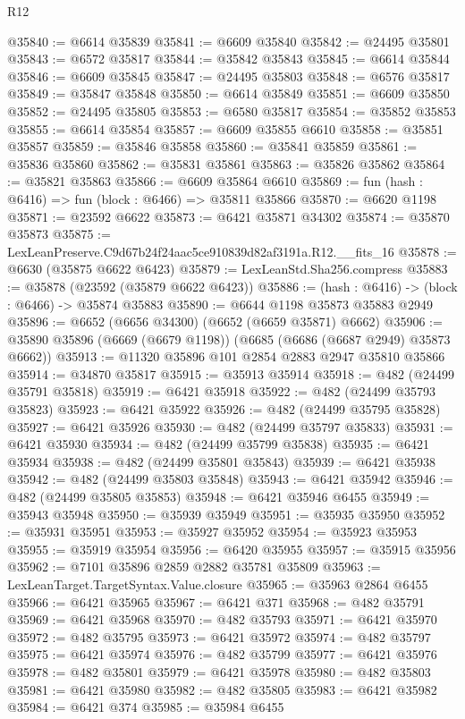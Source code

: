 \begin{lexlean}{R12}
\begin{coremodule}
@35840 := @6614 @35839
@35841 := @6609 @35840
@35842 := @24495 @35801
@35843 := @6572 @35817
@35844 := @35842 @35843
@35845 := @6614 @35844
@35846 := @6609 @35845
@35847 := @24495 @35803
@35848 := @6576 @35817
@35849 := @35847 @35848
@35850 := @6614 @35849
@35851 := @6609 @35850
@35852 := @24495 @35805
@35853 := @6580 @35817
@35854 := @35852 @35853
@35855 := @6614 @35854
@35857 := @6609 @35855 @6610
@35858 := @35851 @35857
@35859 := @35846 @35858
@35860 := @35841 @35859
@35861 := @35836 @35860
@35862 := @35831 @35861
@35863 := @35826 @35862
@35864 := @35821 @35863
@35866 := @6609 @35864 @6610
@35869 := fun (hash : @6416) => fun (block : @6466) => @35811 @35866
@35870 := @6620 @1198
@35871 := @23592 @6622
@35873 := @6421 @35871 @34302
@35874 := @35870 @35873
@35875 := LexLeanPreserve.C9d67b24f24aac5ce910839d82af3191a.R12.__fits_16
@35878 := @6630 (@35875 @6622 @6423)
@35879 := LexLeanStd.Sha256.compress
@35883 := @35878 (@23592 (@35879 @6622 @6423))
@35886 := (hash : @6416) -> (block : @6466) -> @35874 @35883
@35890 := @6644 @1198 @35873 @35883 @2949
@35896 := @6652 (@6656 @34300) (@6652 (@6659 @35871) @6662)
@35906 := @35890 @35896 (@6669 (@6679 @1198)) (@6685 (@6686 (@6687 @2949) @35873 @6662))
@35913 := @11320 @35896 @101 @2854 @2883 @2947 @35810 @35866
@35914 := @34870 @35817
@35915 := @35913 @35914
@35918 := @482 (@24499 @35791 @35818)
@35919 := @6421 @35918
@35922 := @482 (@24499 @35793 @35823)
@35923 := @6421 @35922
@35926 := @482 (@24499 @35795 @35828)
@35927 := @6421 @35926
@35930 := @482 (@24499 @35797 @35833)
@35931 := @6421 @35930
@35934 := @482 (@24499 @35799 @35838)
@35935 := @6421 @35934
@35938 := @482 (@24499 @35801 @35843)
@35939 := @6421 @35938
@35942 := @482 (@24499 @35803 @35848)
@35943 := @6421 @35942
@35946 := @482 (@24499 @35805 @35853)
@35948 := @6421 @35946 @6455
@35949 := @35943 @35948
@35950 := @35939 @35949
@35951 := @35935 @35950
@35952 := @35931 @35951
@35953 := @35927 @35952
@35954 := @35923 @35953
@35955 := @35919 @35954
@35956 := @6420 @35955
@35957 := @35915 @35956
@35962 := @7101 @35896 @2859 @2882 @35781 @35809
@35963 := LexLeanTarget.TargetSyntax.Value.closure
@35965 := @35963 @2864 @6455
@35966 := @6421 @35965
@35967 := @6421 @371
@35968 := @482 @35791
@35969 := @6421 @35968
@35970 := @482 @35793
@35971 := @6421 @35970
@35972 := @482 @35795
@35973 := @6421 @35972
@35974 := @482 @35797
@35975 := @6421 @35974
@35976 := @482 @35799
@35977 := @6421 @35976
@35978 := @482 @35801
@35979 := @6421 @35978
@35980 := @482 @35803
@35981 := @6421 @35980
@35982 := @482 @35805
@35983 := @6421 @35982
@35984 := @6421 @374
@35985 := @35984 @6455

\end{coremodule}
\end{lexlean}
